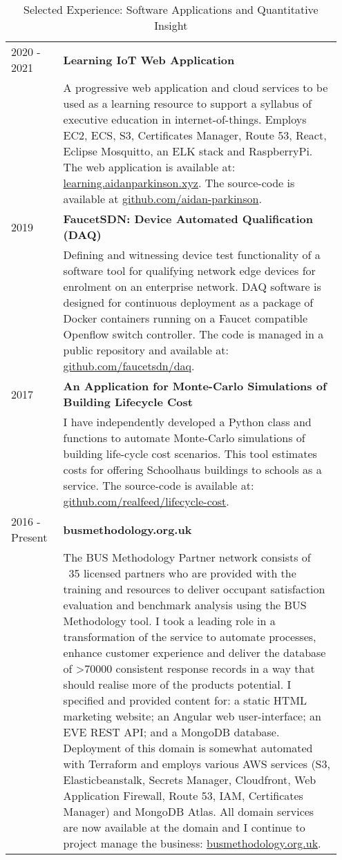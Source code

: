 \documentclass[11pt, oneside]{article}   	%
\begin{document}
\begin{table}[h]
\caption*{Selected Experience: Software Applications and Quantitative Insight}
\vspace{-5mm}
\small
\begin{center}
\begin{tabular}{p{0.15\linewidth} p{0.8\linewidth}}
\hline
2020 - 2021 &\textbf{Learning IoT Web Application} \\
&A progressive web application and cloud services to be used as a learning resource to support a syllabus of executive education in internet-of-things. Employs EC2, ECS, S3, Certificates Manager, Route 53, React, Eclipse Mosquitto, an ELK stack and RaspberryPi. The web application is available at: \url{learning.aidanparkinson.xyz}. The source-code is available at \url{github.com/aidan-parkinson}. \\
2019&\textbf{FaucetSDN: Device Automated Qualification (DAQ)} \\
&Defining and witnessing device test functionality of a software tool for qualifying network edge devices for enrolment on an enterprise network. DAQ software is designed for continuous deployment as a package of Docker containers running on a Faucet compatible Openflow switch controller. The code is managed in a public repository and available at: \url{github.com/faucetsdn/daq}. \\
2017&\textbf{An Application for Monte-Carlo Simulations of Building Lifecycle Cost} \\
&I have independently developed a Python class and functions to automate Monte-Carlo simulations of building life-cycle cost scenarios. This tool estimates costs for offering Schoolhaus buildings to schools as a service. The source-code is available at: \url{github.com/realfeed/lifecycle-cost}. \\
2016 - Present&\textbf{busmethodology.org.uk} \\
&The BUS Methodology Partner network consists of ~35 licensed partners who are provided with the training and resources to deliver occupant satisfaction evaluation and benchmark analysis using the BUS Methodology tool. I took a leading role in a transformation of the service to automate processes, enhance customer experience and deliver the database of >70000 consistent response records in a way that should realise more of the products potential. I specified and provided content for: a static HTML marketing website; an Angular web user-interface; an EVE REST API; and a MongoDB database. Deployment of this domain is somewhat automated with Terraform and employs various AWS services (S3, Elasticbeanstalk, Secrets Manager, Cloudfront, Web Application Firewall, Route 53, IAM, Certificates Manager) and MongoDB Atlas. All domain services are now available at the domain and I continue to project manage the business: \url{busmethodology.org.uk}. \\

\end{tabular}
\end{center}
\end{table}
\end{document}

